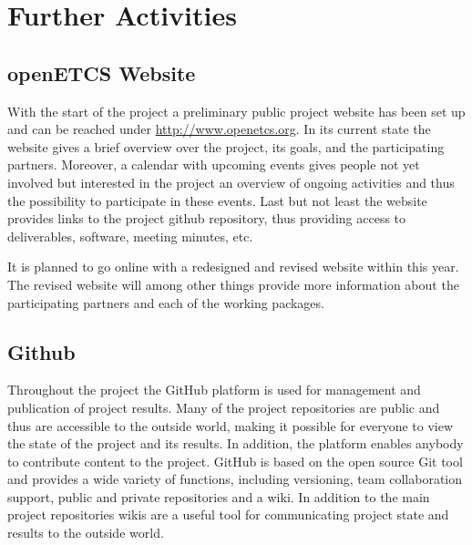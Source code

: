 ﻿\section{Further Activities}\label{sct:further_activities}

\subsection{openETCS Website}
With the start of the project a preliminary public project website has been set up and can be reached under \url{http://www.openetcs.org}. In its current state the website gives a brief overview over the project, its goals, and the participating partners. Moreover, a calendar with upcoming events gives people not yet involved but interested in the project an overview of ongoing activities and thus the possibility to participate in these events. Last but not least the website provides links to the project github repository, thus providing access to deliverables, software, meeting minutes, etc.

It is planned to go online with a redesigned and revised website within this year. The revised website will among other things provide more information about the participating partners and each of the working packages.


\subsection{Github}

Throughout the project the GitHub platform \cite{github} is used for management and publication of project results. Many of the project repositories are public and thus are accessible to the outside world, making it possible for everyone to view the state of the project and its results. In addition, the platform enables anybody to contribute content to the project. GitHub is based on the open source Git tool \cite{gittool} and provides a wide variety of functions, including versioning, team collaboration support, public and private repositories and a wiki. In addition to the main project repositories wikis are a useful tool for communicating project state and results to the outside world.




